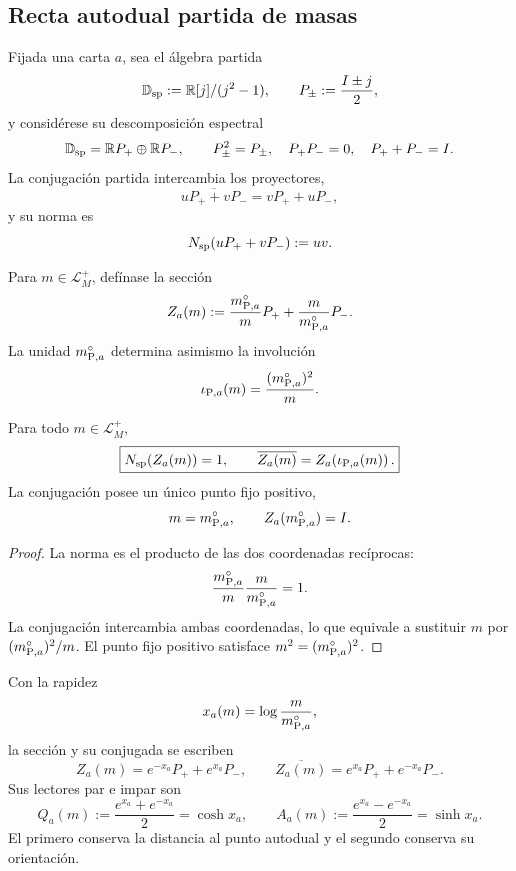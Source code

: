 \subsection{Recta autodual partida de masas}

Fijada una carta \(a\), sea el álgebra partida
\[
 \mathbb D_{\rm sp}:=\mathbb R[j]/(j^2-1),
 \qquad
 P_\pm:=\frac{I\pm j}{2},
\]
y considérese su descomposición espectral
\[
 \mathbb D_{\rm sp}
 =\mathbb R P_+\oplus\mathbb R P_-,
 \qquad
 P_\pm^2=P_\pm,\quad
 P_+P_-=0,\quad
 P_++P_-=I.
\]
La conjugación partida intercambia los proyectores,
\[
 \overline{uP_++vP_-}=vP_++uP_-,
\]
y su norma es
\[
 N_{\rm sp}(uP_++vP_-):=uv.
\]

Para \(m\in\mathcal L_M^+\), defínase la sección
\begin{equation}
 Z_a(m)
 :=\frac{m_{{\rm P},a}^{\circ}}{m}P_+
   +\frac{m}{m_{{\rm P},a}^{\circ}}P_- .
 \label{mdg:eq:planck-ct108-seccion-partida-masa-rev3}
\end{equation}
La unidad \(m_{{\rm P},a}^{\circ}\) determina asimismo la involución
\begin{equation}
 \iota_{{\rm P},a}(m)
 =\frac{(m_{{\rm P},a}^{\circ})^2}{m}.
 \label{mdg:eq:planck-ct108-involucion-masas-rev3}
\end{equation}

\begin{theorem}
\label{mdg:thm:planck-ct108-recta-partida-masa-rev3}
Para todo \(m\in\mathcal L_M^+\),
\begin{equation}
 \boxed{
 N_{\rm sp}(Z_a(m))=1,
 \qquad
 \overline{Z_a(m)}
 =Z_a\!\left(\iota_{{\rm P},a}(m)\right).}
 \label{mdg:eq:planck-ct108-norma-conjugacion-rev3}
\end{equation}
La conjugación posee un único punto fijo positivo,
\[
 m=m_{{\rm P},a}^{\circ},
 \qquad
 Z_a(m_{{\rm P},a}^{\circ})=I.
\]
\end{theorem}

\begin{proof}
La norma es el producto de las dos coordenadas recíprocas:
\[
 \frac{m_{{\rm P},a}^{\circ}}m
 \frac m{m_{{\rm P},a}^{\circ}}=1.
\]
La conjugación intercambia ambas coordenadas, lo que equivale a sustituir
\(m\) por \((m_{{\rm P},a}^{\circ})^2/m\). El punto fijo positivo satisface
\(m^2=(m_{{\rm P},a}^{\circ})^2\).
\end{proof}

Con la rapidez
\begin{equation}
 x_a(m)=\log\frac{m}{m_{{\rm P},a}^{\circ}},
 \label{mdg:eq:planck-ct108-rapidez-masa-rev3}
\end{equation}
la sección y su conjugada se escriben
\[
 Z_a(m)=e^{-x_a}P_++e^{x_a}P_-,
 \qquad
 \overline{Z_a(m)}
 =e^{x_a}P_++e^{-x_a}P_-.
\]
Sus lectores par e impar son
\begin{equation}
 Q_a(m):=\frac{e^{x_a}+e^{-x_a}}2=\cosh x_a,
 \qquad
 A_a(m):=\frac{e^{x_a}-e^{-x_a}}2=\sinh x_a.
 \label{mdg:eq:planck-ct108-lectores-par-impar-rev3}
\end{equation}
El primero conserva la distancia al punto autodual y el segundo conserva su
orientación.

